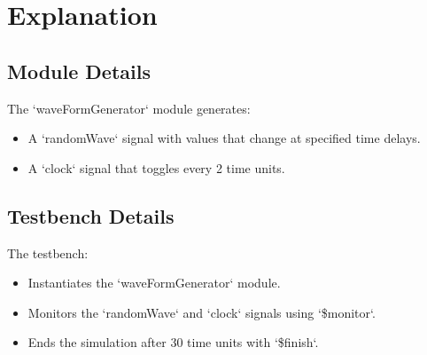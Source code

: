 \section*{Explanation}

\subsection*{Module Details}
The `waveFormGenerator` module generates:
\begin{itemize}
    \item A `randomWave` signal with values that change at specified time delays.
    \item A `clock` signal that toggles every 2 time units.
\end{itemize}

\subsection*{Testbench Details}
The testbench:
\begin{itemize}
    \item Instantiates the `waveFormGenerator` module.
    \item Monitors the `randomWave` and `clock` signals using `\$monitor`.
    \item Ends the simulation after 30 time units with `\$finish`.
\end{itemize}